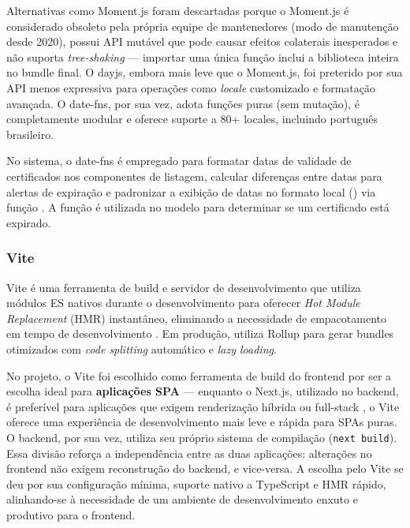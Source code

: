 Alternativas como Moment.js foram descartadas porque o Moment.js é considerado obsoleto pela própria equipe de mantenedores (modo de manutenção desde 2020), possui API mutável que pode causar efeitos colaterais inesperados e não suporta \textit{tree-shaking} — importar uma única função inclui a biblioteca inteira no bundle final. O dayjs, embora mais leve que o Moment.js, foi preterido por sua API menos expressiva para operações como \textit{locale} customizado e formatação avançada. O date-fns, por sua vez, adota funções puras (sem mutação), é completamente modular e oferece suporte a 80+ locales, incluindo português brasileiro.

No sistema, o date-fns é empregado para formatar datas de validade de certificados nos componentes de listagem, calcular diferenças entre datas para alertas de expiração e padronizar a exibição de datas no formato local () via função . A função  é utilizada no modelo  para determinar se um certificado está expirado.

\subsubsection{Vite}
Vite é uma ferramenta de build e servidor de desenvolvimento que utiliza módulos ES nativos durante o desenvolvimento para oferecer \textit{Hot Module Replacement} (HMR) instantâneo, eliminando a necessidade de empacotamento em tempo de desenvolvimento \cite{vite2025}. Em produção, utiliza Rollup para gerar bundles otimizados com \textit{code splitting} automático e \textit{lazy loading}.

No projeto, o Vite foi escolhido como ferramenta de build do frontend por ser a escolha ideal para \textbf{aplicações SPA} --- enquanto o Next.js, utilizado no backend, é preferível para aplicações que exigem renderização híbrida ou full-stack \cite{vite2025,nextjs2025}, o Vite oferece uma experiência de desenvolvimento mais leve e rápida para SPAs puras. O backend, por sua vez, utiliza seu próprio sistema de compilação (\texttt{next build}). Essa divisão reforça a independência entre as duas aplicações: alterações no frontend não exigem reconstrução do backend, e vice-versa. A escolha pelo Vite se deu por sua configuração mínima, suporte nativo a TypeScript e HMR rápido, alinhando-se à necessidade de um ambiente de desenvolvimento enxuto e produtivo para o frontend.

